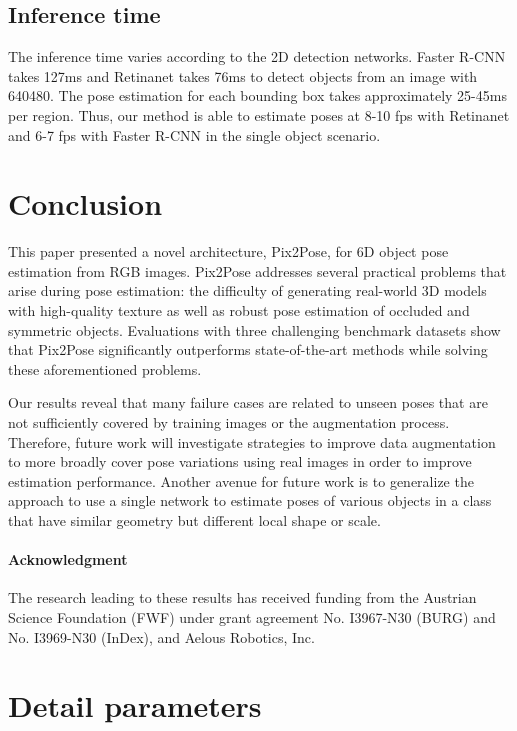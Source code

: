 \documentclass[10pt,twocolumn,letterpaper]{article}
\begin{document}
\subsection{Inference time} \label{inferencetime}
The inference time varies according to the 2D detection networks. Faster R-CNN takes 127ms and Retinanet takes 76ms to detect objects from an image with 640480. The pose estimation for each bounding box takes approximately 25-45ms per region. Thus, our method is able to estimate poses at 8-10 fps with Retinanet and 6-7 fps with Faster R-CNN in the single object scenario.

\section{Conclusion} \label{conclusion}
This paper presented a novel architecture, Pix2Pose, for 6D object pose estimation from RGB images. Pix2Pose addresses several practical problems that arise during pose estimation: the difficulty of generating real-world 3D models with high-quality texture as well as robust pose estimation of occluded and symmetric objects. Evaluations with three challenging benchmark datasets show that Pix2Pose significantly outperforms state-of-the-art methods while solving these aforementioned problems.

Our results reveal that many failure cases are related to unseen poses that are not sufficiently covered by training images or the augmentation process. Therefore, future work will investigate strategies to improve data augmentation to more broadly cover pose variations using real images in order to improve estimation performance. Another avenue for future work is to generalize the approach to use a single network to estimate poses of various objects in a class that have similar geometry but different local shape or scale.

\small{\paragraph{Acknowledgment}
The research leading to these results has received funding from the Austrian Science Foundation (FWF) under grant agreement No. I3967-N30 (BURG) and No. I3969-N30 (InDex), and Aelous Robotics, Inc.}

{\small


}

\onecolumn
\appendix
\section{Detail parameters}
\end{document}
